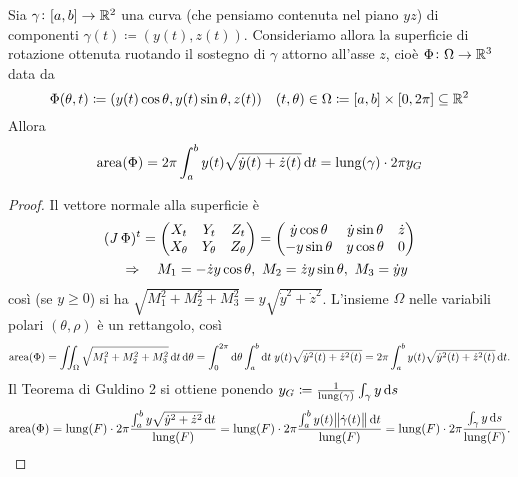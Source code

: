 \begin{thm}
	Sia $ \gamma \colon [a, b] \to \mathbb{R}^2 $ una curva (che pensiamo contenuta nel piano $ yz $) di componenti $ \gamma(t) \coloneqq (y(t), z(t)) $. Consideriamo allora la superficie di rotazione ottenuta ruotando il sostegno di $ \gamma $ attorno all'asse $ z $, cioè $ \Phi \colon \Omega \to \mathbb{R}^3 $ data da 
	\begin{equation}
		\Phi(\theta, t) \coloneqq (y(t) \cos{\theta}, y(t) \sin{\theta}, z(t)) \quad (t, \theta) \in \Omega \coloneqq [a, b] \times [0, 2\pi] \subseteq \mathbb{R}^2
	\end{equation}
	Allora 
	\begin{equation}
		\mathrm{area}(\Phi) = 2\pi \int_{a}^{b} y(t) \sqrt{\dot{y}(t) + \dot{z}(t)} \dif{t} = \mathrm{lung}(\gamma) \cdot 2\pi y_G
	\end{equation}
\end{thm}
%
\begin{proof}
	Il vettore normale alla superficie è
	\begin{gather*}
		(\operatorname{\mathit{J}}{\Phi})^t = 
		\begin{pmatrix}
			X_t & Y_t & Z_t \\
			X_\theta & Y_\theta & Z_\theta
		\end{pmatrix}
		=
		\begin{pmatrix}
			\dot{y} \cos{\theta} & \dot{y} \sin{\theta} & \dot{z} \\
			- y \sin{\theta} & y \cos{\theta} & 0
		\end{pmatrix}
		\\
		\quad \Rightarrow \quad 
		M_1 = - \dot{z} y \cos{\theta}, \ M_2 = \dot{z} y \sin{\theta}, \ M_3 = \dot{y} y
	\end{gather*}
	così (se $ y \geq 0 $) si ha $ \sqrt{M_1^2 + M_2^2 + M_3^2} = y \sqrt{\dot{y}^2 + \dot{z}^2} $. L'insieme $ \Omega $ nelle variabili polari $ (\theta, \rho) $ è un rettangolo, così
	\[
		\mathrm{area}(\Phi) = \iint_\Omega \sqrt{M_1^2 + M_2^2 + M_3^2} \dif{t} \dif{\theta} = \int_{0}^{2\pi} \dif{\theta} \int_{a}^{b} \dif{t} \; y(t) \sqrt{\dot{y}^2(t) + \dot{z}^2(t)} = 2\pi \int_{a}^{b} y(t) \sqrt{\dot{y}^2(t) + \dot{z}^2(t)} \dif{t}.
	\]
	Il Teorema di Guldino 2 si ottiene ponendo $ y_G \coloneqq \frac{1}{\mathrm{lung}(\gamma)} \int_{\gamma} y \dif{s} $
	\[
		\mathrm{area}(\Phi) = \mathrm{lung}(F) \cdot 2\pi \frac{\int_{a}^{b} y \sqrt{\dot{y}^2 + \dot{z}^2} \dif{t}}{\mathrm{lung}(F)} = \mathrm{lung}(F) \cdot 2\pi \frac{\int_{a}^{b} y(t) \norm{\dot{\gamma}(t)} \dif{t}}{\mathrm{lung}(F)} = \mathrm{lung}(F) \cdot 2\pi \frac{\int_\gamma y \dif{s}}{\mathrm{lung}(F)}. \qedhere
	\]
\end{proof}

